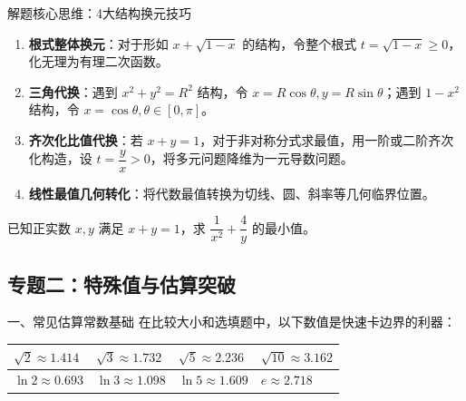 \documentclass[11pt,a4paper]{ctexart}
\begin{document}
\begin{keybox}{解题核心思维：4大结构换元技巧}
\begin{enumerate}
  \item \textbf{根式整体换元}：对于形如 $x + \sqrt{1-x}$ 的结构，令整个根式 $t = \sqrt{1-x} \geqslant 0$，化无理为有理二次函数。
  \item \textbf{三角代换}：遇到 $x^2 + y^2 = R^2$ 结构，令 $x = R\cos\theta, y = R\sin\theta$；遇到 $1 - x^2$ 结构，令 $x = \cos\theta, \theta \in [0, \pi]$。
  \item \textbf{齐次化比值代换}：若 $x+y=1$，对于非对称分式求最值，用一阶或二阶齐次化构造，设 $t = \dfrac{y}{x} > 0$，将多元问题降维为一元导数问题。
  \item \textbf{线性最值几何转化}：将代数最值转换为切线、圆、斜率等几何临界位置。
\end{enumerate}
\end{keybox}

{\small 已知正实数 $x, y$ 满足 $x + y = 1$，求 $\dfrac{1}{x^2} + \dfrac{4}{y}$ 的最小值。}

\newpage

\subsection{专题二：特殊值与估算突破}

\begin{theorembox}{一、常见估算常数基础}
在比较大小和选填题中，以下数值是快速卡边界的利器：
\begin{center}
\begin{tabularx}{0.85\textwidth}{XXXX}
\toprule[1.1pt]
\(\sqrt{2} \approx 1.414\) & \(\sqrt{3} \approx 1.732\) & \(\sqrt{5} \approx 2.236\) & \(\sqrt{10} \approx 3.162\) \\ \hline
\(\ln 2 \approx 0.693\) & \(\ln 3 \approx 1.098\) & \(\ln 5 \approx 1.609\) & \(e \approx 2.718\) \\
\bottomrule[1.1pt]
\end{tabularx}
\end{center}
\end{theorembox}
\end{document}

